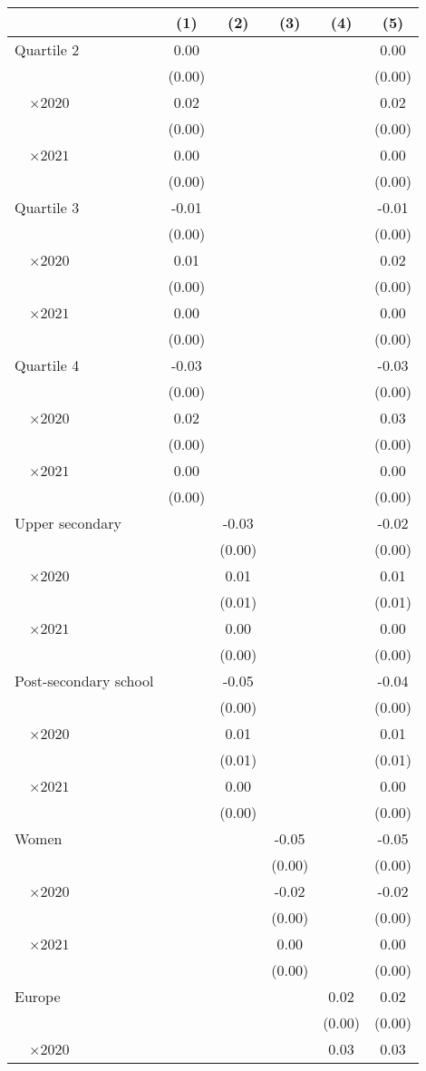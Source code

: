 
\begin{tabular}{@{}l*{5}{S[table-format={-}2.2{\tnote{***}}]}@{}}
\toprule
{} & {(1)} & {(2)} & {(3)} & {(4)} & {(5)}\tabularnewline%
\midrule
Quartile 2 & 0.00 &  &  &  & 0.00\tabularnewline%
 & (0.00) &  &  &  & \vphantom{8} (0.00)\tabularnewline%
~~\(\times 2020\) & 0.02\tnote{***} &  &  &  & 0.02\tnote{***}\tabularnewline%
 & (0.00) &  &  &  & \vphantom{7} (0.00)\tabularnewline%
~~\(\times 2021\) & 0.00 &  &  &  & \vphantom{2} 0.00\tabularnewline%
 & (0.00) &  &  &  & \vphantom{6} (0.00)\tabularnewline%
Quartile 3 & -0.01\tnote{***} &  &  &  & -0.01\tnote{*}\tabularnewline%
 & (0.00) &  &  &  & \vphantom{5} (0.00)\tabularnewline%
~~\(\times 2020\) & 0.01\tnote{**} &  &  &  & 0.02\tnote{***}\tabularnewline%
 & (0.00) &  &  &  & \vphantom{4} (0.00)\tabularnewline%
~~\(\times 2021\) & 0.00 &  &  &  & \vphantom{1} 0.00\tabularnewline%
 & (0.00) &  &  &  & \vphantom{3} (0.00)\tabularnewline%
Quartile 4 & -0.03\tnote{***} &  &  &  & -0.03\tnote{***}\tabularnewline%
 & (0.00) &  &  &  & \vphantom{2} (0.00)\tabularnewline%
~~\(\times 2020\) & 0.02\tnote{***} &  &  &  & 0.03\tnote{***}\tabularnewline%
 & (0.00) &  &  &  & \vphantom{1} (0.00)\tabularnewline%
~~\(\times 2021\) & 0.00 &  &  &  & 0.00\tabularnewline%
 & (0.00) &  &  &  & (0.00)\tabularnewline%
Upper secondary &  & -0.03\tnote{***} &  &  & -0.02\tnote{***}\tabularnewline%
 &  & (0.00) &  &  & \vphantom{3} (0.00)\tabularnewline%
~~\(\times 2020\) &  & 0.01 &  &  & 0.01\tabularnewline%
 &  & (0.01) &  &  & \vphantom{1} (0.01)\tabularnewline%
~~\(\times 2021\) &  & 0.00 &  &  & \vphantom{1} 0.00\tabularnewline%
 &  & (0.00) &  &  & \vphantom{2} (0.00)\tabularnewline%
Post-secondary school &  & -0.05\tnote{***} &  &  & -0.04\tnote{***}\tabularnewline%
 &  & (0.00) &  &  & \vphantom{1} (0.00)\tabularnewline%
~~\(\times 2020\) &  & 0.01\tnote{\dagger} &  &  & 0.01\tabularnewline%
 &  & (0.01) &  &  & (0.01)\tabularnewline%
~~\(\times 2021\) &  & 0.00 &  &  & 0.00\tabularnewline%
 &  & (0.00) &  &  & (0.00)\tabularnewline%
Women &  &  & -0.05\tnote{***} &  & -0.05\tnote{***}\tabularnewline%
 &  &  & (0.00) &  & \vphantom{2} (0.00)\tabularnewline%
~~\(\times 2020\) &  &  & -0.02\tnote{***} &  & -0.02\tnote{***}\tabularnewline%
 &  &  & (0.00) &  & \vphantom{1} (0.00)\tabularnewline%
~~\(\times 2021\) &  &  & 0.00 &  & 0.00\tabularnewline%
 &  &  & (0.00) &  & (0.00)\tabularnewline%
Europe &  &  &  & 0.02\tnote{***} & 0.02\tnote{***}\tabularnewline%
 &  &  &  & (0.00) & \vphantom{4} (0.00)\tabularnewline%
~~\(\times 2020\) &  &  &  & 0.03\tnote{***} & 0.03\tnote{***}\tabularnewline%

\end{tabular}
